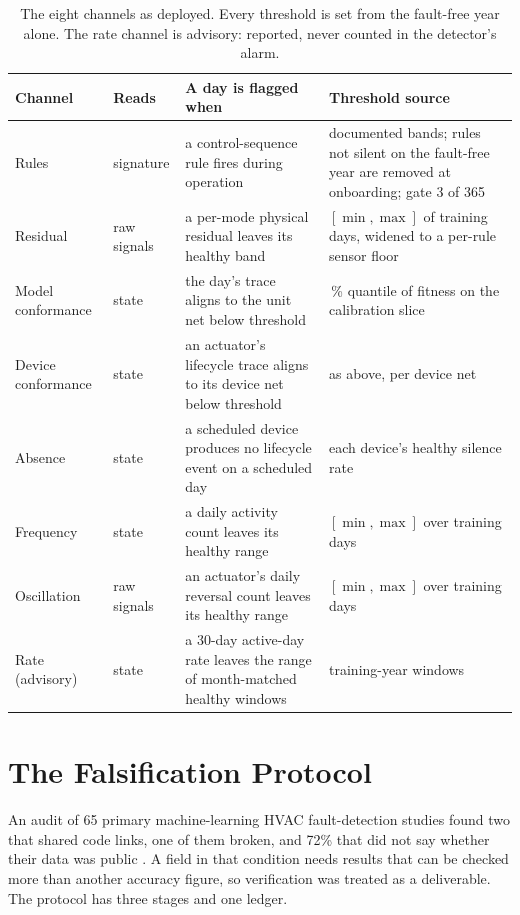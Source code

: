 \documentclass[11pt,letterpaper]{article}
\begin{document}
\begin{table}[htbp]
\centering
\caption{The eight channels as deployed. Every threshold is set from the fault-free year alone. The rate channel is advisory: reported, never counted in the detector's alarm.}
\label{tab:channels}
\small\setlength{\tabcolsep}{4pt}
\begin{tabular}{@{}>{\raggedright\arraybackslash}p{2.3cm}>{\raggedright\arraybackslash}p{1.5cm}>{\raggedright\arraybackslash}p{5.2cm}>{\raggedright\arraybackslash}p{4.6cm}@{}}
\hline
Channel & Reads & A day is flagged when & Threshold source \\
\hline
Rules & signature & a control-sequence rule fires during operation & documented bands; rules not silent on the fault-free year are removed at onboarding; gate 3 of 365 \\
Residual & raw signals & a per-mode physical residual leaves its healthy band & $[\min,\max]$ of training days, widened to a per-rule sensor floor \\
Model conformance & state & the day's trace aligns to the unit net below threshold & 1\,\% quantile of fitness on the calibration slice \\
Device conformance & state & an actuator's lifecycle trace aligns to its device net below threshold & as above, per device net \\
Absence & state & a scheduled device produces no lifecycle event on a scheduled day & each device's healthy silence rate \\
Frequency & state & a daily activity count leaves its healthy range & $[\min,\max]$ over training days \\
Oscillation & raw signals & an actuator's daily reversal count leaves its healthy range & $[\min,\max]$ over training days \\
Rate (advisory) & state & a 30-day active-day rate leaves the range of month-matched healthy windows & training-year windows \\
\hline
\end{tabular}
\end{table}

\section{The Falsification Protocol}
\label{sec:protocol}
An audit of 65 primary machine-learning HVAC fault-detection studies found two that shared code links, one of them broken, and 72\% that did not say whether their data was public \cite{mukhtar2025reproducibility}. A field in that condition needs results that can be checked more than another accuracy figure, so verification was treated as a deliverable. The protocol has three stages and one ledger.
\end{document}
